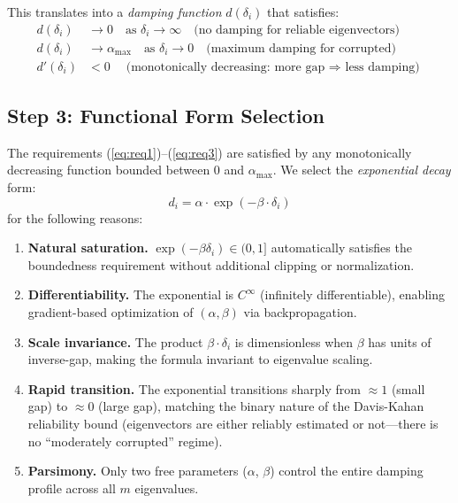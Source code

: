 \documentclass[preprint,review,12pt]{elsarticle}
\begin{document}
This translates into a \emph{damping function} $d(\delta_i)$ that satisfies:
\begin{align}
d(\delta_i) &\to 0 \quad \text{as } \delta_i \to \infty \quad \text{(no damping for reliable eigenvectors)} \label{eq:req1} \\
d(\delta_i) &\to \alpha_{\max} \quad \text{as } \delta_i \to 0 \quad \text{(maximum damping for corrupted)} \label{eq:req2} \\
d'(\delta_i) &< 0 \quad \text{(monotonically decreasing: more gap $\Rightarrow$ less damping)} \label{eq:req3}
\end{align}

\subsection{Step 3: Functional Form Selection}

The requirements (\ref{eq:req1})--(\ref{eq:req3}) are satisfied by any monotonically decreasing function bounded between 0 and $\alpha_{\max}$. We select the \emph{exponential decay} form:
\begin{equation}
d_i = \alpha \cdot \exp(-\beta \cdot \delta_i)
\label{eq:damping_function}
\end{equation}
for the following reasons:

\begin{enumerate}
\item \textbf{Natural saturation.} $\exp(-\beta\delta_i) \in (0, 1]$ automatically satisfies the boundedness requirement without additional clipping or normalization.
\item \textbf{Differentiability.} The exponential is $C^\infty$ (infinitely differentiable), enabling gradient-based optimization of $(\alpha, \beta)$ via backpropagation.
\item \textbf{Scale invariance.} The product $\beta \cdot \delta_i$ is dimensionless when $\beta$ has units of inverse-gap, making the formula invariant to eigenvalue scaling.
\item \textbf{Rapid transition.} The exponential transitions sharply from $\approx 1$ (small gap) to $\approx 0$ (large gap), matching the binary nature of the Davis-Kahan reliability bound (eigenvectors are either reliably estimated or not---there is no ``moderately corrupted'' regime).
\item \textbf{Parsimony.} Only two free parameters ($\alpha$, $\beta$) control the entire damping profile across all $m$ eigenvalues.
\end{enumerate}
\end{document}
